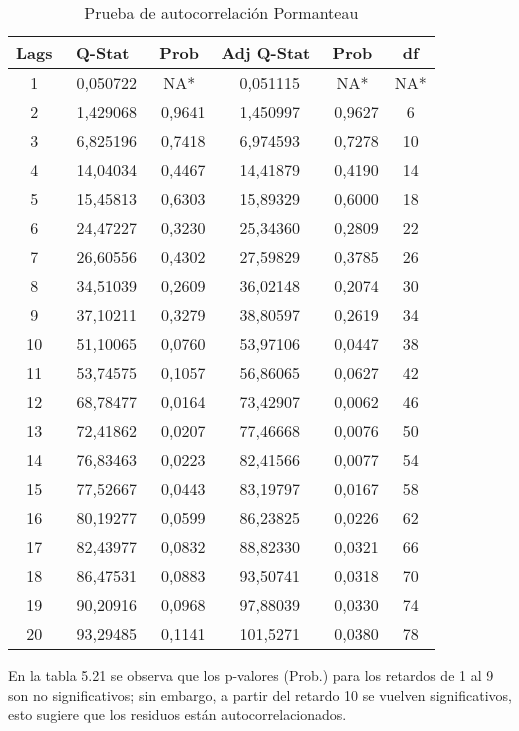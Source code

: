 \begin{enumerate}
\begin{table}[H]
\centering
\begin{tabular}{cccccc}\hline\hline
Lags & Q-Stat & Prob & Adj Q-Stat & Prob & df \\ \hline \hline
1 & ~0,050722 & NA* & ~0,051115 & NA* & NA* \\
2 & ~1,429068 & ~0,9641 & ~1,450997 & ~0,9627 & 6 \\
3 & ~6,825196 & ~0,7418 & ~6,974593 & ~0,7278 & 10 \\
4 & ~14,04034 & ~0,4467 & ~14,41879 & ~0,4190 & 14 \\
5 & ~15,45813 & ~0,6303 & ~15,89329 & ~0,6000 & 18 \\
6 & ~24,47227 & ~0,3230 & ~25,34360 & ~0,2809 & 22 \\
7 & ~26,60556 & ~0,4302 & ~27,59829 & ~0,3785 & 26 \\
8 & ~34,51039 & ~0,2609 & ~36,02148 & ~0,2074 & 30 \\
9 & ~37,10211 & ~0,3279 & ~38,80597 & ~0,2619 & 34 \\
10& ~51,10065 & ~0,0760 & ~53,97106 & ~0,0447 & 38 \\
11& ~53,74575 & ~0,1057 & ~56,86065 & ~0,0627 & 42 \\
12& ~68,78477 & ~0,0164 & ~73,42907 & ~0,0062 & 46 \\
13& ~72,41862 & ~0,0207 & ~77,46668 & ~0,0076 & 50 \\
14& ~76,83463 & ~0,0223 & ~82,41566 & ~0,0077 & 54 \\
15& ~77,52667 & ~0,0443 & ~83,19797 & ~0,0167 & 58 \\
16& ~80,19277 & ~0,0599 & ~86,23825 & ~0,0226 & 62 \\
17& ~82,43977 & ~0,0832 & ~88,82330 & ~0,0321 & 66 \\
18& ~86,47531 & ~0,0883 & ~93,50741 & ~0,0318 & 70 \\
19& ~90,20916 & ~0,0968 & ~97,88039 & ~0,0330 & 74 \\
20& ~93,29485 & ~0,1141 & ~101,5271 & ~0,0380 & 78 \\ \hline\hline
\end{tabular}
\caption{Prueba de autocorrelaci\'{o}n Pormanteau}
\label{tab37}
\end{table}

En la tabla 5.21 se observa que los p-valores (Prob.) para los retardos de 1 al 9 son no significativos; sin embargo, a partir del retardo 10 se vuelven significativos, esto sugiere que los residuos est\'{a}n autocorrelacionados.\newline


\end{enumerate}
